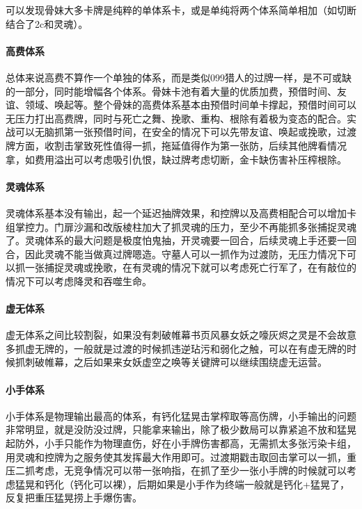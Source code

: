 ﻿\documentclass[12pt, a4paper]{article}
\begin{document}
可以发现骨妹大多卡牌是纯粹的单体系卡，或是单纯将两个体系简单相加（如切断结合了2c和灵魂）。

\paragraph{高费体系}
总体来说高费不算作一个单独的体系，而是类似099猎人的过牌一样，是不可或缺的一部分，同时能增幅各个体系。骨妹卡池有着大量的优质加费，预借时间、友谊、领域、唤起等。整个骨妹的高费体系基本由预借时间单卡撑起，预借时间可以无压力打出高费牌，同时与死亡之舞、挽歌、重构、根除有着极为变态的配合。实战可以无脑抓第一张预借时间，在安全的情况下可以先带友谊、唤起或挽歌，过渡牌方面，收割击掌致死性值得一抓，拖延值得作为第一张防，后续其他牌看情况拿，如费用溢出可以考虑吸引仇恨，缺过牌考虑切断，金卡缺伤害补压榨根除。

\paragraph{灵魂体系}
灵魂体系基本没有输出，起一个延迟抽牌效果，和控牌以及高费相配合可以增加卡组掌控力。门扉沙漏和改版棱柱加大了抓灵魂的压力，至少不再能抓多张捕捉灵魂了。灵魂体系的最大问题是极度怕鬼抽，开灵魂要一回合，后续灵魂上手还要一回合，因此灵魂不能当做真过牌嗯造。守墓人可以一抓作为过渡防，无压力情况下可以抓一张捕捉灵魂或挽歌，在有灵魂的情况下就可以考虑死亡行军了，在有敲位的情况下可以考虑降灵和吞噬生命。

\paragraph{虚无体系}
虚无体系之间比较割裂，如果没有刺破帷幕书页风暴女妖之嚎灰烬之灵是不会故意多抓虚无牌的，一般就是过渡的时候抓违逆玷污和弱化之触，可以在有虚无牌的时候抓刺破帷幕，之后如果来女妖虚空之唤等关键牌可以继续围绕虚无运营。

\paragraph{小手体系}
小手体系是物理输出最高的体系，有钙化猛晃击掌榨取等高伤牌，小手输出的问题非常明显，就是没防没过牌，只能拿来输出，除了极少数局可以靠紧追不放和猛晃起防外，小手只能作为物理直伤，好在小手牌伤害都高，无需抓太多张污染卡组，用灵魂和控牌为之服务使其发挥最大作用即可。过渡期戳击取回击掌可以一抓，重压二抓考虑，无竞争情况可以带一张响指，在抓了至少一张小手牌的时候就可以考虑猛晃和钙化（钙化可以裸），后期如果是小手作为终端一般就是钙化+猛晃了，反复把重压猛晃捞上手爆伤害。
\end{document}
